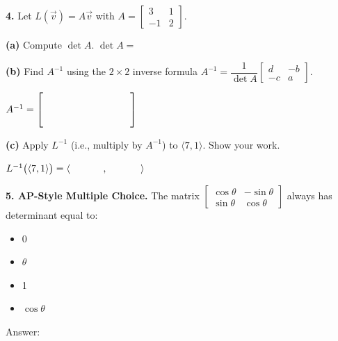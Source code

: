 \documentclass[10pt]{article}
\begin{document}
\begin{notesbox}
\textbf{4.} Let $L(\vec{v})=A\vec{v}$ with $A=\begin{bmatrix}3&1\\-1&2\end{bmatrix}$.

\vspace{0.06in}
\textbf{(a)} Compute $\det A$. \hspace{1em} $\det A = $ \blank{3cm}

\vspace{0.10in}
\textbf{(b)} Find $A^{-1}$ using the $2\times2$ inverse formula
$A^{-1}=\dfrac{1}{\det A}\begin{bmatrix}d&-b\\-c&a\end{bmatrix}$.


$A^{-1} = \begin{bmatrix}\hspace{1.4cm}&\hspace{1.4cm}\\[10pt]\hspace{1.4cm}&\hspace{1.4cm}\end{bmatrix}$

\vspace{0.10in}
\textbf{(c)} Apply $L^{-1}$ (i.e., multiply by $A^{-1}$) to $\langle7,1\rangle$.
Show your work.


$L^{-1}\bigl(\langle7,1\rangle\bigr) = \left\langle\hspace{1.2cm},\hspace{1.2cm}\right\rangle$
\end{notesbox}

\vspace{0.10in}

\begin{notesbox}
\textbf{5. AP-Style Multiple Choice.}
The matrix $\begin{bmatrix}\cos\theta&-\sin\theta\\\sin\theta&\cos\theta\end{bmatrix}$
always has determinant equal to:

\vspace{0.08in}
\begin{itemize}[leftmargin=2em, itemsep=4pt]
  \item[(A)] 0
  \item[(B)] $\theta$
  \item[(C)] 1
  \item[(D)] $\cos\theta$
\end{itemize}

\vspace{0.08in}
Answer: \blank{2cm}
\end{notesbox}
\end{document}
